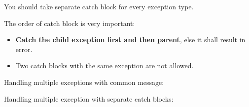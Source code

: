 \setlength{\columnsep}{3pt}
\begin{flushleft}
	
	\item You should take separate catch block for every exception type.
	\item The order of catch block is very important:
	\begin{itemize}
		\item \textbf{Catch the child exception first and then parent}, else it shall result in error.
		\item Two catch blocks with the same exception are not allowed.
	\end{itemize}
	
	\item Handling multiple exceptions with common message:

	\bigskip	
	\newpage
	
	\item Handling multiple exception with separate catch blocks:
	

\end{flushleft}
